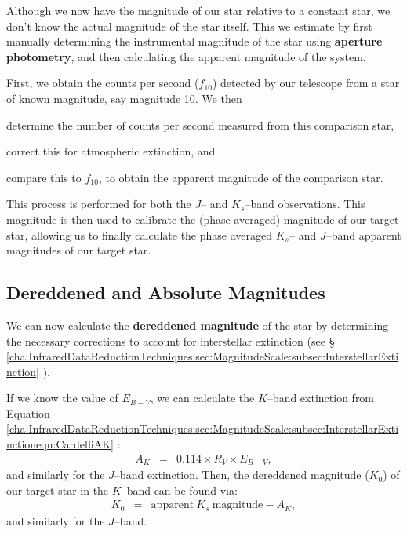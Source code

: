Although we now have the magnitude of our star relative to a constant
star, we don't know the actual magnitude of the star itself. This we
estimate by first manually determining the instrumental magnitude of the
star using \textbf{aperture photometry}, and then calculating the apparent magnitude of the system. %

\vspace{\myparskip}

First, we obtain the counts per second ($f_{10}$) detected by our
telescope from a star of known magnitude, say magnitude 10. We then
\begin{inparaenum}[(i)]
\item determine the number of counts per second measured from this comparison star,
\item correct this for atmospheric extinction, and
\item compare this to $f_{10}$, to obtain the apparent magnitude of the comparison star.
\end{inparaenum}

\vspace{\myparskip}

This process is performed for both the $J$-- and $K_{s}$--band observations. This magnitude is then used to calibrate the (phase averaged) magnitude of our target star, allowing us to finally calculate the phase averaged $K_{s}$-- and $J$--band apparent magnitudes of our target star. %


\subsection{Dereddened and Absolute Magnitudes}
\label{cha:InfraredDataReductionTechniques:sec:Photometry:subsec:DereddenedMagnitude}

We can now calculate the \textbf{dereddened magnitude} of the star by
determining the necessary corrections to account for interstellar
extinction (see \S~%
\vref{cha:InfraredDataReductionTechniques:sec:MagnitudeScale:subsec:InterstellarExtinction}%
). %

\vspace{\myparskip}

If we know the value of $E_{B-V}$, we can calculate the $K$--band extinction from Equation~%
\vref{cha:InfraredDataReductionTechniques:sec:MagnitudeScale:subsec:InterstellarExtinctioneqn:CardelliAK}%
: %
\begin{eqnarray}
\label{cha:InfraredDataReductionTechniques:sec:Photometry:subsec:DereddenedMagnitude:eqn:CardelliAK}
A_{K}    & = & 0.114 \times R_V \times E_{B-V}, \nonumber
\end{eqnarray}
and similarly for the $J$--band extinction. Then, the dereddened
magnitude ($K_{0}$) of our target star in the $K$--band can be found via:
\begin{eqnarray}
\label{cha:InfraredDataReductionTechniques:sec:Photometry:subsec:DereddenedMagnitude:eqn:K0}
K_0 & = & \mathrm{apparent\ } K_{s} \mathrm{\ magnitude} - A_K,
\end{eqnarray}
and similarly for the $J$--band. %

